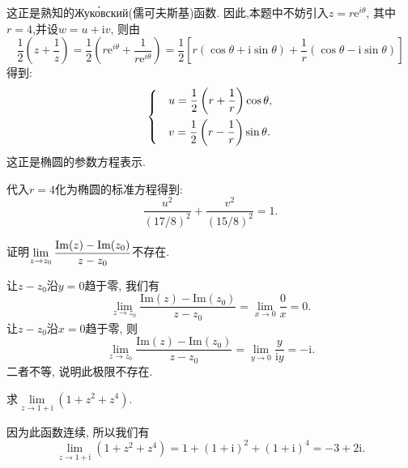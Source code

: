 \begin{yySolution}
	这正是熟知的Жуко́вский(儒可夫斯基)函数. 因此,本题中不妨引入$z = r\mathrm{e}^{i\theta}$, 其中$r = 4$,并设$w = u + \mathrm{i}v$,
	则由\begin{equation*}
		\frac{1}{2}\left( z+\frac{1}{z} \right) = \frac{1}{2}\left( r\mathrm{e}^{i\theta} + \frac{1}{r\mathrm{e}^{i\theta}} \right) = \frac{1}{2}\left[ r(\cos\theta+\mathrm{i}\sin\theta) + \frac{1}{r}(\cos\theta-\mathrm{i}\sin\theta)  \right]
	\end{equation*}
	得到:
	\begin{equation*}
		\begin{dcases}
			&u = \frac{1}{2}\left( r+\frac{1}{r} \right)\cos\theta, \\
			&v = \frac{1}{2}\left( r-\frac{1}{r} \right)\sin\theta.
		\end{dcases}
	\end{equation*}
	这正是椭圆的参数方程表示.
	
	代入$r=4$化为椭圆的标准方程得到:
	\begin{equation*}
		\frac{u^2}{(17/8)^2}+\frac{v^2}{(15/8)^2} = 1.
	\end{equation*}
\end{yySolution}

\begin{yyEx}
	证明$\begin{lgathered}\lim\limits_{z\to z_0}\frac{\mathrm{Im}(z)-\mathrm{Im}(z_0)}{z-z_0}\end{lgathered}$不存在.
\end{yyEx}

\begin{yySolution}
	让$z-z_0$沿$y=0$趋于零, 我们有
	\begin{equation*}
		\lim\limits_{z\to z_0}\frac{\mathrm{Im}(z)-\mathrm{Im}(z_0)}{z-z_0} = \lim\limits_{x\to 0} \frac{0}{x} = 0.
	\end{equation*}
	让$z-z_0$沿$x=0$趋于零, 则
	\begin{equation*}
		\lim\limits_{z\to z_0}\frac{\mathrm{Im}(z)-\mathrm{Im}(z_0)}{z-z_0} = \lim\limits_{y\to 0} \frac{y}{\mathrm{i}y} = -\mathrm{i}.
	\end{equation*}
	二者不等, 说明此极限不存在.
\end{yySolution}

\begin{yyEx}
	求$\lim\limits_{z\to 1+\mathrm{i}}\left( 1+z^2+z^4 \right)$.
\end{yyEx}

\begin{yySolution}
    因为此函数连续, 所以我们有
    \begin{equation*}
        \lim\limits_{z\to 1+\mathrm{i}}\left( 1+z^2+z^4 \right) = 1+(1+\mathrm{i})^2+(1+\mathrm{i})^4 = -3+2\mathrm{i}.
    \end{equation*}
\end{yySolution}

